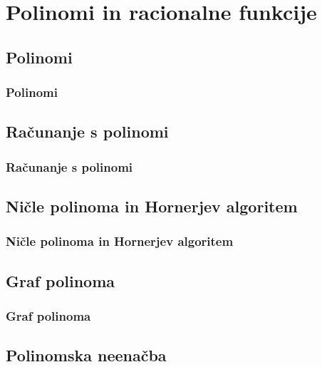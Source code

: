 \section{Polinomi in racionalne funkcije}

\begin{frame}
    \sectionpage
\end{frame}

\begin{frame}
\end{frame}

    \subsection{Polinomi}

        \begin{frame}
            \frametitle{Polinomi}
        \end{frame}

    \subsection{Računanje s polinomi}

        \begin{frame}
            \frametitle{Računanje s polinomi}
        \end{frame}

    \subsection{Ničle polinoma in Hornerjev algoritem}

        \begin{frame}
            \frametitle{Ničle polinoma in Hornerjev algoritem}
        \end{frame}

    \subsection{Graf polinoma}

        \begin{frame}
            \frametitle{Graf polinoma}
        \end{frame}

    \subsection{Polinomska neenačba}


